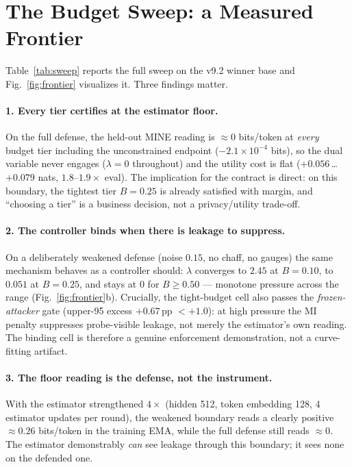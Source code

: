 \documentclass[10pt]{article}
\begin{document}
\section{The Budget Sweep: a Measured Frontier}
\label{sec:sweep}

Table~\ref{tab:sweep} reports the full sweep on the v9.2 winner base and
Fig.~\ref{fig:frontier} visualizes it.  Three findings matter.

\paragraph{1. Every tier certifies at the estimator floor.}
On the full defense, the held-out MINE reading is $\approx 0$ bits/token
at \emph{every} budget tier including the unconstrained endpoint
($-2.1\!\times\!10^{-4}$ bits), so the dual variable never engages
($\lambda = 0$ throughout) and the utility cost is flat
($+0.056$\,\ldots\,$+0.079$ nats, $1.8$–$1.9\times$ eval).  The
implication for the contract is direct: on this boundary, the tightest
tier $B{=}0.25$ is already satisfied with margin, and ``choosing a tier''
is a business decision, not a privacy/utility trade-off.

\paragraph{2. The controller binds when there is leakage to suppress.}
On a deliberately weakened defense (noise $0.15$, no chaff, no gauges)
the same mechanism behaves as a controller should: $\lambda$ converges to
$2.45$ at $B{=}0.10$, to $0.051$ at $B{=}0.25$, and stays at $0$ for
$B \ge 0.50$ — monotone pressure across the range
(Fig.~\ref{fig:frontier}b).  Crucially, the tight-budget cell also passes
the \emph{frozen-attacker} gate (upper-95 excess $+0.67$\,pp $< +1.0$):
at high pressure the MI penalty suppresses probe-visible leakage, not
merely the estimator's own reading.  The binding cell is therefore a
genuine enforcement demonstration, not a curve-fitting artifact.

\paragraph{3. The floor reading is the defense, not the instrument.}
With the estimator strengthened $4\times$ (hidden 512, token embedding
128, 4 estimator updates per round), the weakened boundary reads a
clearly positive $\approx 0.26$ bits/token in the training EMA, while the
full defense still reads $\approx 0$.  The estimator demonstrably
\emph{can} see leakage through this boundary; it sees none on the
defended one.
\end{document}
